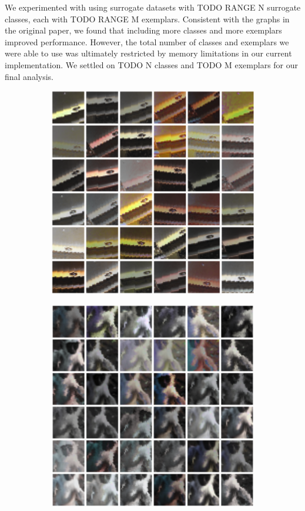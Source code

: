 \documentclass{article} %
\begin{document}
We experimented with using surrogate datasets with TODO RANGE N surrogate classes, each with TODO RANGE M exemplars. Consistent with the graphs in the original paper, we found that including more classes and more exemplars improved performance. However, the total number of classes and exemplars we were able to use was ultimately restricted by memory limitations in our current implementation. We settled on TODO N classes and TODO M exemplars for our final analysis.

\begin{figure}[h]
\centering
\begin{subfigure}{0.3\textwidth}
  \centering
  \includegraphics[width=\textwidth]{figs/patch_noflip_lines.png}
\end{subfigure}
\begin{subfigure}{0.3\textwidth}
  \centering
  \includegraphics[width=\textwidth]{figs/patch_noflip_lemur.png}

\end{subfigure}
\end{figure}
\end{document}
